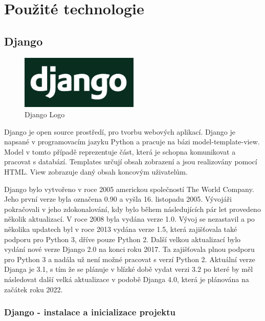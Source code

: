 \chapter{Použité technologie}
\label{2-technologie}

\section{Django}

\begin{figure}[H] \centering
    \includegraphics[width=160pt]{./pictures/django-logo.png}
    \caption[Django Logo]{Django Logo \cite{}}
	\label{fig:Django Logo}                                
\end{figure}

Django je open source prostředí, pro tvorbu webových aplikací. Django
je napsané v programovacím jazyku Python a pracuje na bázi
model-template-view. Model v tomto případě reprezentuje část, která je
schopna komunikovat a pracovat s databází. Templates určují obsah
zobrazení a jsou realizovány pomocí HTML. View zobrazuje daný obsah
koncovým uživatelům.

Django bylo vytvořeno v roce 2005 americkou společností The World
Company. Jeho první verze byla označena 0.90 a vyšla 16. listopadu
2005. Vývojáři pokračovali v jeho zdokonalování, kdy bylo během
následujících pár let provedeno několik aktualizací. V roce 2008 byla
vydána verze 1.0. Vývoj se nezastavil a po několika updatech byl v
roce 2013 vydána verze 1.5, která zajišťovala také podporu pro
Python 3, dříve pouze Python 2. Další velkou aktualizací bylo vydání nové
verze Django 2.0 na konci roku 2017. Ta zajišťovala plnou podporu pro
Python 3 a nadála už není možné pracovat s verzí Python 2. Aktuální
verze Djanga je 3.1, s tím že se plánuje v blízké době vydat verzi 3.2
po které by měl následovat další velká aktualizace v podobě Djanga 4.0,
která je plánována na začátek roku 2022. \cite{django}

\newpage


\subsection{Django - instalace a inicializace projektu}

